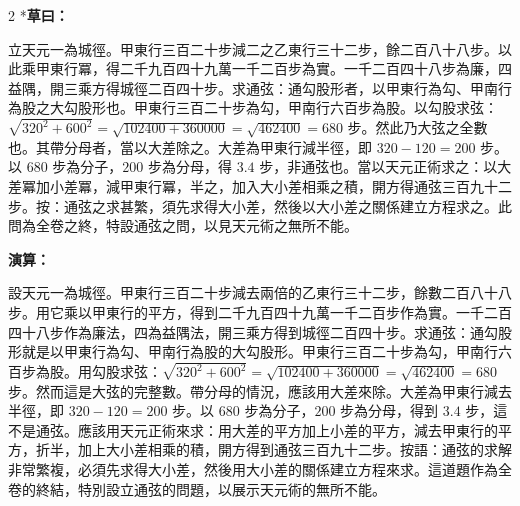 \documentclass[11pt,a4paper]{article}
\begin{document}
\begin{paracol}{2}
\switchcolumn[0]*\textbf{草曰：}

\small 立天元一為城徑。甲東行三百二十步減二之乙東行三十二步，餘二百八十八步。以此乘甲東行冪，得二千九百四十九萬一千二百步為實。一千二百四十八步為廉，四益隅，開三乘方得城徑二百四十步。求通弦：通勾股形者，以甲東行為勾、甲南行為股之大勾股形也。甲東行三百二十步為勾，甲南行六百步為股。以勾股求弦：$\sqrt{320^2 + 600^2} = \sqrt{102400 + 360000} = \sqrt{462400} = 680$ 步。然此乃大弦之全數也。其帶分母者，當以大差除之。大差為甲東行減半徑，即 $320 - 120 = 200$ 步。以 $680$ 步為分子，$200$ 步為分母，得 $3.4$ 步，非通弦也。當以天元正術求之：以大差冪加小差冪，減甲東行冪，半之，加入大小差相乘之積，開方得通弦三百九十二步。按：通弦之求甚繁，須先求得大小差，然後以大小差之關係建立方程求之。此問為全卷之終，特設通弦之問，以見天元術之無所不能。

\switchcolumn\textbf{演算：}

\small 設天元一為城徑。甲東行三百二十步減去兩倍的乙東行三十二步，餘數二百八十八步。用它乘以甲東行的平方，得到二千九百四十九萬一千二百步作為實。一千二百四十八步作為廉法，四為益隅法，開三乘方得到城徑二百四十步。求通弦：通勾股形就是以甲東行為勾、甲南行為股的大勾股形。甲東行三百二十步為勾，甲南行六百步為股。用勾股求弦：$\sqrt{320^2 + 600^2} = \sqrt{102400 + 360000} = \sqrt{462400} = 680$ 步。然而這是大弦的完整數。帶分母的情況，應該用大差來除。大差為甲東行減去半徑，即 $320 - 120 = 200$ 步。以 $680$ 步為分子，$200$ 步為分母，得到 $3.4$ 步，這不是通弦。應該用天元正術來求：用大差的平方加上小差的平方，減去甲東行的平方，折半，加上大小差相乘的積，開方得到通弦三百九十二步。按語：通弦的求解非常繁複，必須先求得大小差，然後用大小差的關係建立方程來求。這道題作為全卷的終結，特別設立通弦的問題，以展示天元術的無所不能。
\end{paracol}

\vspace{0.1cm}
\noindent{}
\par\vspace{0.3cm}
\end{document}
